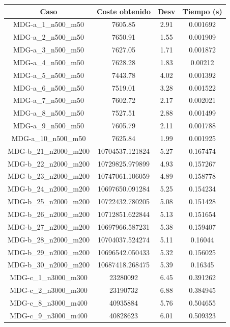 \documentclass{article}
\begin{document}
\begin{table}[H]
	
	\centering
	\begin{tabular}{|cccc|}
		\hline
		Caso & Coste obtenido & Desv & Tiempo (s)\\ \hline
		MDG-a\_1\_n500\_m50 & 7605.85 & 2.91 & 0.001692\\
		MDG-a\_2\_n500\_m50 & 7650.91 & 1.55 & 0.001909\\
		MDG-a\_3\_n500\_m50 & 7627.05 & 1.71 & 0.001872\\
		MDG-a\_4\_n500\_m50 & 7628.28 & 1.83 & 0.00212\\
		MDG-a\_5\_n500\_m50 & 7443.78 & 4.02 & 0.001392\\
		MDG-a\_6\_n500\_m50 & 7519.01 & 3.28 & 0.001522\\
		MDG-a\_7\_n500\_m50 & 7602.72 & 2.17 & 0.002021\\
		MDG-a\_8\_n500\_m50 & 7527.51 & 2.88 & 0.001499\\
		MDG-a\_9\_n500\_m50 & 7605.79 & 2.11 & 0.001788\\
		MDG-a\_10\_n500\_m50 & 7625.84 & 1.99 & 0.001925\\
		MDG-b\_21\_n2000\_m200 & 10704537.121824 & 5.27 & 0.167474\\
		MDG-b\_22\_n2000\_m200 & 10729825.979899 & 4.93 & 0.157267\\
		MDG-b\_23\_n2000\_m200 & 10747061.106059 & 4.89 & 0.158778\\
		MDG-b\_24\_n2000\_m200 & 10697650.091284 & 5.25 & 0.154234\\
		MDG-b\_25\_n2000\_m200 & 10722432.780205 & 5.08 & 0.151428\\
		MDG-b\_26\_n2000\_m200 & 10712851.622844 & 5.13 & 0.151654\\
		MDG-b\_27\_n2000\_m200 & 10697966.587231 & 5.38 & 0.159407\\
		MDG-b\_28\_n2000\_m200 & 10704037.524274 & 5.11 & 0.16044\\
		MDG-b\_29\_n2000\_m200 & 10696542.050433 & 5.32 & 0.156025\\
		MDG-b\_30\_n2000\_m200 & 10687418.268475 & 5.39 & 0.16345\\
		MDG-c\_1\_n3000\_m300 & 23280092 & 6.45 & 0.391262\\
		MDG-c\_2\_n3000\_m300 & 23190732 & 6.88 & 0.384945\\
		MDG-c\_8\_n3000\_m400 & 40935884 & 5.76 & 0.504655\\
		MDG-c\_9\_n3000\_m400 & 40828623 & 6.01 & 0.509323\\

\end{tabular}
\end{table}
\end{document}
